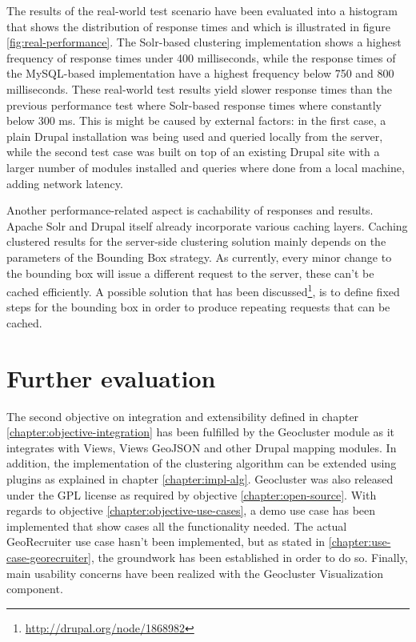 The results of the real-world test scenario have been evaluated into a histogram that shows the distribution of response times and which is illustrated in figure \ref{fig:real-performance}. The Solr-based clustering implementation shows a highest frequency of response times under 400 milliseconds, while the response times of the MySQL-based implementation have a highest frequency below 750 and 800 milliseconds. These real-world test results yield slower response times than the previous performance test where Solr-based response times where constantly below 300 ms. This is might be caused by external factors: in the first case, a plain Drupal installation was being used and queried locally from the server, while the second test case was built on top of an existing Drupal site with a larger number of modules installed and queries where done from a local machine, adding network latency.

Another performance-related aspect is cachability of responses and results. Apache Solr and Drupal itself already incorporate various caching layers. Caching clustered results for the server-side clustering solution mainly depends on the parameters of the Bounding Box strategy. As currently, every minor change to the bounding box will issue a different request to the server, these can't be cached efficiently. A possible solution that has been discussed\footnote{\url{http://drupal.org/node/1868982}}, is to define fixed steps for the bounding box in order to produce repeating requests that can be cached.  

\section{Further evaluation}

The second objective on integration and extensibility defined in chapter \ref{chapter:objective-integration} has been fulfilled by the Geocluster module as it integrates with Views, Views GeoJSON and other Drupal mapping modules. In addition, the implementation of the clustering algorithm can be extended using plugins as explained in chapter \ref{chapter:impl-alg}. Geocluster was also released under the GPL license as required by objective \ref{chapter:open-source}. With regards to objective \ref{chapter:objective-use-cases}, a demo use case has been implemented that show cases all the functionality needed. The actual GeoRecruiter use case hasn't been implemented, but as stated in \ref{chapter:use-case-georecruiter}, the groundwork has been established in order to do so. Finally, main usability concerns have been realized with the Geocluster Visualization component.

